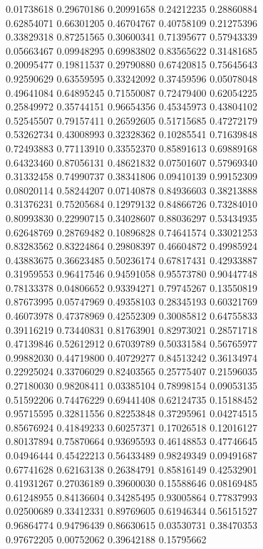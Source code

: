 \begin{figure}
   0.01738618   0.29670186
   0.20991658   0.24212235
   0.28860884   0.62854071
   0.66301205   0.46704767
   0.40758109   0.21275396
   0.33829318   0.87251565
   0.30600341   0.71395677
   0.57943339   0.05663467
   0.09948295   0.69983802
   0.83565622   0.31481685
   0.20095477   0.19811537
   0.29790880   0.67420815
   0.75645643   0.92590629
   0.63559595   0.33242092
   0.37459596   0.05078048
   0.49641084   0.64895245
   0.71550087   0.72479400
   0.62054225   0.25849972
   0.35744151   0.96654356
   0.45345973   0.43804102
   0.52545507   0.79157411
   0.26592605   0.51715685
   0.47272179   0.53262734
   0.43008993   0.32328362
   0.10285541   0.71639848
   0.72493883   0.77113910
   0.33552370   0.85891613
   0.69889168   0.64323460
   0.87056131   0.48621832
   0.07501607   0.57969340
   0.31332458   0.74990737
   0.38341806   0.09410139
   0.99152309   0.08020114
   0.58244207   0.07140878
   0.84936603   0.38213888
   0.31376231   0.75205684
   0.12979132   0.84866726
   0.73284010   0.80993830
   0.22990715   0.34028607
   0.88036297   0.53434935
   0.62648769   0.28769482
   0.10896828   0.74641574
   0.33021253   0.83283562
   0.83224864   0.29808397
   0.46604872   0.49985924
   0.43883675   0.36623485
   0.50236174   0.67817431
   0.42933887   0.31959553
   0.96417546   0.94591058
   0.95573780   0.90447748
   0.78133378   0.04806652
   0.93394271   0.79745267
   0.13550819   0.87673995
   0.05747969   0.49358103
   0.28345193   0.60321769
   0.46073978   0.47378969
   0.42552309   0.30085812
   0.64755833   0.39116219
   0.73440831   0.81763901
   0.82973021   0.28571718
   0.47139846   0.52612912
   0.67039789   0.50331584
   0.56765977   0.99882030
   0.44719800   0.40729277
   0.84513242   0.36134974
   0.22925024   0.33706029
   0.82403565   0.25775407
   0.21596035   0.27180030
   0.98208411   0.03385104
   0.78998154   0.09053135
   0.51592206   0.74476229
   0.69441408   0.62124735
   0.15188452   0.95715595
   0.32811556   0.82253848
   0.37295961   0.04274515
   0.85676924   0.41849233
   0.60257371   0.17026518
   0.12016127   0.80137894
   0.75870664   0.93695593
   0.46148853   0.47746645
   0.04946444   0.45422213
   0.56433489   0.98249349
   0.09491687   0.67741628
   0.62163138   0.26384791
   0.85816149   0.42532901
   0.41931267   0.27036189
   0.39600030   0.15588646
   0.08169485   0.61248955
   0.84136604   0.34285495
   0.93005864   0.77837993
   0.02500689   0.33412331
   0.89769605   0.61946344
   0.56151527   0.96864774
   0.94796439   0.86630615
   0.03530731   0.38470353
   0.97672205   0.00752062
   0.39642188   0.15795662

\end{figure}
